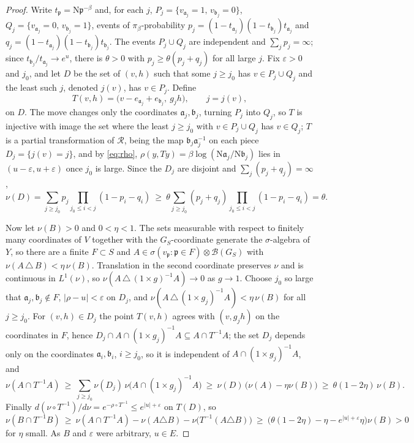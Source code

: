 \documentclass[11pt]{amsart}
\numberwithin{equation}{section}
\theoremstyle{definition}
\theoremstyle{remark}
\newcommand{\cR}{\mathcal{R}}
\newcommand{\pp}{\mathfrak{p}}
\newcommand{\aaa}{\mathfrak{a}}
\newcommand{\bb}{\mathfrak{b}}
\newcommand{\Ns}{\mathrm{N}}
\begin{document}
\begin{proof}
Write $t_\pp=\Ns\pp^{-\beta}$ and, for each $j$,
$P_j=\{v_{\aaa_j}=1,\,v_{\bb_j}=0\}$, $Q_j=\{v_{\aaa_j}=0,\,v_{\bb_j}=1\}$, events of
$\pi_\beta$-probability $p_j=(1-t_{\aaa_j})(1-t_{\bb_j})t_{\aaa_j}$ and
$q_j=(1-t_{\aaa_j})(1-t_{\bb_j})t_{\bb_j}$. The events $P_j\cup Q_j$ are independent and
$\sum_jp_j=\infty$; since $t_{\bb_j}/t_{\aaa_j}\to e^{u}$, there is $\theta>0$ with
$p_j\ge\theta(p_j+q_j)$ for all large $j$. Fix $\varepsilon>0$ and $j_0$, and let $D$ be the
set of $(v,h)$ such that some $j\ge j_0$ has $v\in P_j\cup Q_j$ and the least such $j$,
denoted $j(v)$, has $v\in P_j$. Define
\[
T(v,h)=\bigl(v-e_{\aaa_j}+e_{\bb_j},\ g_jh\bigr),\qquad j=j(v),
\]
on $D$. The move changes only the coordinates $\aaa_j,\bb_j$, turning $P_j$ into $Q_j$, so
$T$ is injective with image the set where the least $j\ge j_0$ with $v\in P_j\cup Q_j$ has
$v\in Q_j$; $T$ is a partial transformation of $\cR$, being the map $\bb_j\aaa_j^{-1}$ on
each piece $D_j=\{j(v)=j\}$, and by \eqref{eq:rho}, $\rho(y,Ty)=\beta\log(\Ns\aaa_j/\Ns\bb_j)$
lies in $(u-\varepsilon,u+\varepsilon)$ once $j_0$ is large. Since the $D_j$ are disjoint
and $\sum_j(p_j+q_j)=\infty$,
\[
\nu(D)=\sum_{j\ge j_0}p_j\prod_{j_0\le i<j}(1-p_i-q_i)
\ \ge\ \theta\sum_{j\ge j_0}(p_j+q_j)\prod_{j_0\le i<j}(1-p_i-q_i)=\theta .
\]

Now let $\nu(B)>0$ and $0<\eta<1$. The sets measurable with respect to finitely many
coordinates of $V$ together with the $G_S$-coordinate generate the $\sigma$-algebra of $Y$,
so there are a finite $F\subset S$ and $A\in\sigma(v_\pp:\pp\in F)\otimes\mathcal B(G_S)$ with
$\nu(A\,\triangle\,B)<\eta\,\nu(B)$. Translation in the second coordinate preserves $\nu$
and is continuous in $L^1(\nu)$, so $\nu(A\,\triangle\,(1\times g)^{-1}A)\to0$ as $g\to1$.
Choose $j_0$ so large that $\aaa_j,\bb_j\notin F$, $|\rho-u|<\varepsilon$ on $D_j$, and
$\nu(A\,\triangle\,(1\times g_j)^{-1}A)<\eta\,\nu(B)$ for all $j\ge j_0$. For
$(v,h)\in D_j$ the point $T(v,h)$ agrees with $(v,g_jh)$ on the coordinates in $F$, hence
$D_j\cap A\cap(1\times g_j)^{-1}A\subseteq A\cap T^{-1}A$; the set $D_j$ depends only on
the coordinates $\aaa_i,\bb_i$, $i\ge j_0$, so it is independent of
$A\cap(1\times g_j)^{-1}A$, and
\[
\nu(A\cap T^{-1}A)\ \ge\ \sum_{j\ge j_0}\nu(D_j)\,\nu\bigl(A\cap(1\times g_j)^{-1}A\bigr)
\ \ge\ \nu(D)\,\bigl(\nu(A)-\eta\nu(B)\bigr)\ \ge\ \theta(1-2\eta)\,\nu(B).
\]
Finally $d(\nu\circ T^{-1})/d\nu=e^{-\rho\circ T^{-1}}\le e^{|u|+\varepsilon}$ on $T(D)$, so
\[
\nu(B\cap T^{-1}B)\ \ge\ \nu(A\cap T^{-1}A)-\nu(A\triangle B)-\nu\bigl(T^{-1}(A\triangle B)\bigr)
\ \ge\ \bigl(\theta(1-2\eta)-\eta-e^{|u|+\varepsilon}\eta\bigr)\nu(B)>0
\]
for $\eta$ small. As $B$ and $\varepsilon$ were arbitrary, $u\in E$.
\end{proof}
\end{document}
